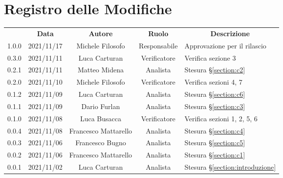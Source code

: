 \thispagestyle{empty}
\section*{Registro delle Modifiche}

\begin{center}
\renewcommand{\arraystretch}{1.8}
\begin{longtable}[c]{c | c | c | c | p{5cm}}
\rowcolor[HTML]{125E28}
\multicolumn{1}{c}{\color[HTML]{FFFFFF} \textbf{Versione}} & 
\multicolumn{1}{c}{\color[HTML]{FFFFFF} \textbf{Data}} & 
\multicolumn{1}{c}{\color[HTML]{FFFFFF} \textbf{Autore}} & 
\multicolumn{1}{c}{\color[HTML]{FFFFFF} \textbf{Ruolo}} & 
\multicolumn{1}{c}{\color[HTML]{FFFFFF} \textbf{Descrizione}} \\

1.0.0 & 2021/11/17 & Michele Filosofo & Responsabile & Approvazione per il rilascio \\ \hline

0.3.0 & 2021/11/11 & Luca Carturan& Verificatore & Verifica sezione 3\\ \hline

0.2.1 & 2021/11/11 & Matteo Midena & Analista & Stesura §\ref{section:c2}\\ \hline
0.2.0 & 2021/11/10 & Michele Filosofo & Verificatore & Verifica sezioni 4, 7\\ \hline

0.1.2 & 2021/11/09 & Luca Carturan & Analista & Stesura §\ref{section:c6}\\ \hline
0.1.1 & 2021/11/09 & Dario Furlan & Analista & Stesura §\ref{section:c3}\\ \hline
0.1.0 & 2021/11/08 & Luca Busacca & Verificatore & Verifica sezioni 1, 2, 5, 6\\ \hline
0.0.4 & 2021/11/08 & Francesco Mattarello & Analista & Stesura §\ref{section:c4}\\ \hline

0.0.3 & 2021/11/06 & Francesco Bugno & Analista & Stesura §\ref{section:c5}\\ \hline
0.0.2 & 2021/11/06 & Francesco Mattarello & Analista & Stesura §\ref{section:c1}\\ \hline
0.0.1 & 2021/11/02 & Luca Carturan & Analista & Stesura §\ref{section:introduzione}\\

\end{longtable}

\end{center}